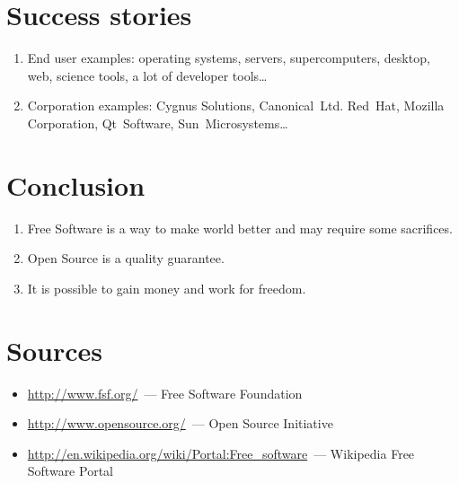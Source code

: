 \documentclass[10pt,a4paper]{article}
\newcommand{\bee}{\begin{enumerate}}
\newcommand{\ene}{\end{enumerate}}
\newcommand{\bit}{\begin{itemize}}
\newcommand{\eit}{\end{itemize}}
\begin{document}
\section{Success stories}
\bee
  \item End user examples: operating systems, servers, supercomputers, desktop, web, science tools, 
a lot of developer tools\dots
  \item Corporation examples: Cygnus Solutions, Canonical~Ltd. Red~Hat, Mozilla Corporation, Qt~Software, 
Sun~Microsystems\dots
\ene

\section{Conclusion}
\bee
  \item Free Software is a way to make world better and may require some 
sacrifices.
  \item Open Source is a quality guarantee.
  \item It is possible to gain money and work for freedom.
\ene

\section*{Sources}
  \bit
    \item \url{http://www.fsf.org/}~--- Free Software Foundation
    \item \url{http://www.opensource.org/}~--- Open Source Initiative
    \item \url{http://en.wikipedia.org/wiki/Portal:Free_software}~--- Wikipedia Free Software Portal
  \eit
\end{document}

